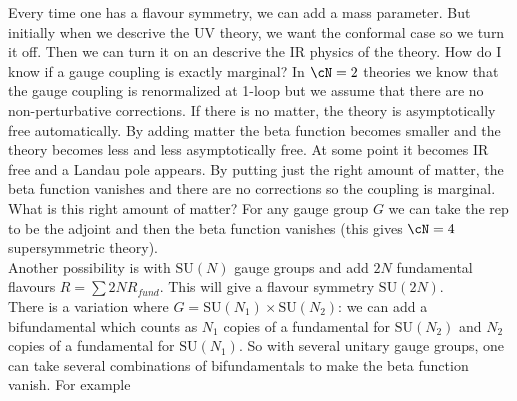 \documentclass[11pt]{article}
\theoremstyle{definition}
\numberwithin{equation}{section}
\newcommand*\SU{\mathrm{SU}}
\begin{document}
Every time one has a flavour symmetry, we can add a mass parameter. But initially when we descrive the UV theory, we want the conformal case so we turn it off. Then we can turn it on an descrive the IR physics of the theory. How do I know if a gauge coupling is exactly marginal? In $\cN=2$ theories we know that the gauge coupling is renormalized at 1-loop but we assume that there are no non-perturbative corrections. If there is no matter, the theory is asymptotically free automatically. By adding matter the beta function becomes smaller and the theory becomes less and less asymptotically free. At some point it becomes IR free and a Landau pole appears. By putting just the right amount of matter, the beta function vanishes and there are no corrections so the coupling is marginal. What is this right amount of matter? For any gauge group $G$ we can take the rep to be the adjoint and then the beta function vanishes (this gives $\cN=4$ supersymmetric theory).\\
Another possibility is with $\SU(N)$ gauge groups and add $2N$ fundamental flavours $R=\sum 2N R_{fund}$. This will give a flavour symmetry $\SU(2N)$.\\
There is a variation where $G=\SU(N_{1})\times \SU(N_{2})$: we can add a bifundamental which counts as $N_{1}$ copies of a fundamental for $\SU(N_{2})$ and $N_{2}$ copies of a fundamental for $\SU(N_{1})$. So with several unitary gauge groups, one can take several combinations of bifundamentals to make the beta function vanish. For example
\end{document}

